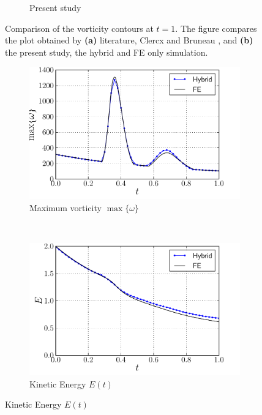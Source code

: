 \begin{figure}[!p]
\begin{subfigure}[t]{0.5\textwidth}
             \caption{Present study}
             \label{fig:hybrid_dipole_contourLine_t1p0}
     \end{subfigure}
     \caption{Comparison of the vorticity contours at $t=1$. The figure compares the plot obtained by \textbf{(a)} literature, Clercx and Bruneau \cite{Clercx2006a}, and \textbf{(b)} the present study, the hybrid and FE only simulation.}
     \label{fig:hybrid_vorticity_contour_comparison}
	\end{figure}	

	\begin{figure}[!p]
     \centering
     \begin{subfigure}[t]{0.49\textwidth}
             \includegraphics[width=\textwidth]{./figures/validation/cbColl/hybrid_doubleMonopole_parameter_wMax.pdf}
             \caption{Maximum vorticity $\max\{\omega\}$}
             \label{fig:hybrid_dipole_maxVorticity_comparison}
     \end{subfigure}%
     ~ %
     \begin{subfigure}[t]{0.49\textwidth}
             \includegraphics[width=\textwidth]{./figures/validation/cbColl/hybrid_doubleMonopole_parameter_E.pdf}
             \caption{Kinetic Energy $E(t)$}
             \label{fig:hybrid_dipole_KineticEnergy_comparison}
     \end{subfigure}
     

\end{figure}
